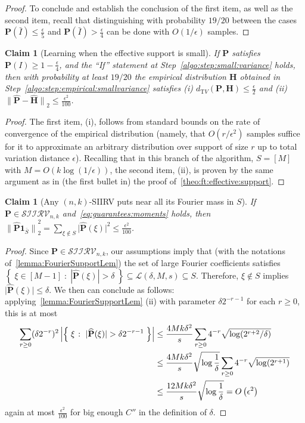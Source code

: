 \documentclass[11pt]{article}
\newtheorem{claim}[theorem]{Claim}
\theoremstyle{definition}
\newcommand{\p}{\mathbf{P}}
\newcommand{\h}{\mathbf{H}}
\newcommand{\dtv}{d_{\mathrm TV}}
\newcommand{\eps}{\epsilon}
\newcommand{\abs}[1]{\lvert#1\rvert}
\newcommand{\norm}[1]{\lVert#1\rVert}
\newcommand{\normtwo}[1]{{\norm{#1}}_2}
\renewcommand{\abs}[1]{\left\lvert #1 \right\rvert}
\newcommand{\dabs}[1]{\lvert #1 \rvert}
\newcommand{\setOfSuchThat}[2]{ \left\{\; #1 \;\colon\; #2\; \right\} } 			\newcommand{\clg}[1]{\left\lceil #1 \right\rceil}
\newcommand{\bigO}[1]{{O\left( #1 \right)}}
\newcommand{\classksiirv}[2][n]{\ensuremath{\mathcal{SIIRV}_{#1,#2}}\xspace}
\newcommand{\fourier}[1]{\widehat{#1}}
\begin{document}
\begin{proof}
To conclude and establish the conclusion of the first item, as well as the second item, recall that distinguishing with probability $19/20$ between the cases $\p(\bar{I})\leq\frac{\eps}{5}$ and $\p(\bar{I})>\frac{\eps}{4}$ can be done with $O(1/\eps)$ samples.
\end{proof}

\begin{claim}[Learning when the effective support is small]\label{claim:learn:empirical}
  If $\p$ satisfies $\p(I)\geq 1-\frac{\eps}{4}$, and the ``If'' statement at Step~\ref{algo:step:small:variance} holds, then with probability at least $19/20$ the empirical distribution $\h$ obtained in Step~\ref{algo:step:empirical:smallvariance} satisfies (i) $\dtv(\p,\h) \leq \frac{\eps}{2}$ and (ii) $\normtwo{\fourier{\p}-\fourier{\h}} \leq \frac{\eps^2}{100}$.
\end{claim}
\begin{proof}The first item, (i), follows from standard bounds on the rate of convergence of the empirical distribution (namely, that $O(r/\eps^2)$ samples suffice for it to approximate an arbitrary distribution over support of size $r$ up to total variation distance $\eps$). Recalling that in this branch of the algorithm, $S=[M]$ with $M=O(k\log(1/\eps))$, the second item, (ii), is proven by the same argument as in (the first bullet in) the proof of~\cref{theo:ft:effective:support}.
\end{proof}

\begin{claim}[Any $(n,k)$-SIIRV puts near all its Fourier mass in $S$]\label{claim:ksiirv:fourier:concentrated}
  If $\p \in \classksiirv[n]{k}$ and~\eqref{eq:guarantees:moments} holds, then
  $
      \normtwo{\fourier{\p}\mathbf{1}_{\bar{S}}}^2 = \sum_{\xi\notin S} \dabs{\fourier{\p}(\xi)}^2 \leq \frac{\eps^2}{100}
  $.
\end{claim}
\begin{proof}Since $\p \in \classksiirv[n]{k}$, our assumptions imply that (with the notations of~\cref{lemma:FourierSupportLem}) the set of large Fourier coefficients satisfies $\setOfSuchThat{\xi\in[M-1]}{ \abs{\fourier{\p}(\xi)} > \delta } \subseteq \mathcal{L}(\delta, M, s)\subseteq S$. Therefore, $\xi\notin S$ implies $\dabs{\fourier{\p}(\xi)} \leq \delta$. We then can conclude as follows: applying~\cref{lemma:FourierSupportLem} (ii) with parameter $\delta 2^{-r-1}$ for each $r \geq 0$, this is at most
\begin{align}
\sum_{r\geq 0} (\delta 2^{-r})^2  \abs{\setOfSuchThat{ \xi }{ |\fourier{\p}(\xi)| > \delta 2^{-r-1} }} 
&\leq  \frac{4Mk \delta^2}{s} \sum_{r\geq 0} 4^{-r}\sqrt{\log(2^{r+2}/\delta)} \notag\\
& \leq \frac{4Mk \delta^2}{s} \sqrt{\log\frac{1}{\delta}} \sum_{r\geq 0} 4^{-r}\sqrt{\log(2^{r+1})} \notag\\
& \leq \frac{12Mk \delta^2}{s} \sqrt{\log\frac{1}{\delta}} = \bigO{\eps^2} \label{eq:dealing:small:coeffs:p}
\end{align}
again at most $\frac{\eps^2}{100}$ for big enough $C''$ in the definition of $\delta$.
\end{proof}
\end{document}
